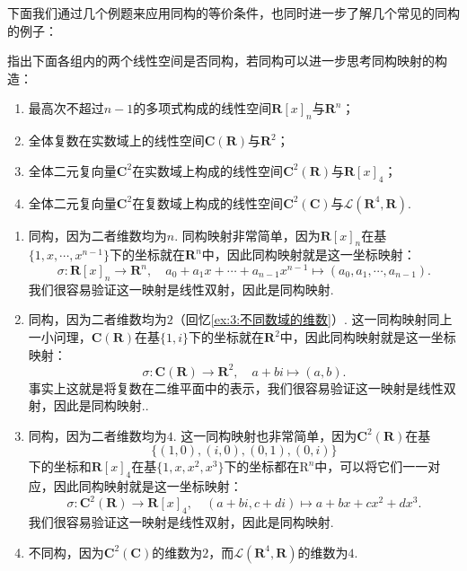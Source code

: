 下面我们通过几个例题来应用同构的等价条件，也同时进一步了解几个常见的同构的例子：
\begin{example}
    指出下面各组内的两个线性空间是否同构，若同构可以进一步思考同构映射的构造：
    \begin{enumerate}
        \item 最高次不超过$n-1$的多项式构成的线性空间$\mathbf{R}[x]_n$与$\mathbf{R}^n$；

        \item 全体复数在实数域上的线性空间$\mathbf{C}(\mathbf{R})$与$\mathbf{R}^2$；

        \item 全体二元复向量$\mathbf{C}^2$在实数域上构成的线性空间$\mathbf{C}^2(\mathbf{R})$与$\mathbf{R}[x]_4$；

        \item 全体二元复向量$\mathbf{C}^2$在复数域上构成的线性空间$\mathbf{C}^2(\mathbf{C})$与$\mathcal{L}(\mathbf{R}^4,\mathbf{R})$.
    \end{enumerate}
\end{example}

\begin{solution}
    \begin{enumerate}
        \item 同构，因为二者维数均为$n$. 同构映射非常简单，因为$\mathbf{R}[x]_n$在基$\{1,x,\cdots,x^{n-1}\}$下的坐标就在$\mathbf{R}^n$中，因此同构映射就是这一坐标映射：
              \[\sigma:\mathbf{R}[x]_n\to\mathbf{R}^n,\quad a_0+a_1x+\cdots+a_{n-1}x^{n-1}\mapsto(a_0,a_1,\cdots,a_{n-1}).\]
              我们很容易验证这一映射是线性双射，因此是同构映射.

        \item 同构，因为二者维数均为$2$（回忆\autoref{ex:3:不同数域的维数}）. 这一同构映射同上一小问理，$\mathbf{C}(\mathbf{R})$在基$\{1,i\}$下的坐标就在$\mathbf{R}^2$中，因此同构映射就是这一坐标映射：
              \[\sigma:\mathbf{C}(\mathbf{R})\to\mathbf{R}^2,\quad a+bi\mapsto(a,b).\]
              事实上这就是将复数在二维平面中的表示，我们很容易验证这一映射是线性双射，因此是同构映射..

        \item 同构，因为二者维数均为$4$. 这一同构映射也非常简单，因为$\mathbf{C}^2(\mathbf{R})$在基
              \[\{(1,0),(i,0),(0,1),(0,i)\}\]
              下的坐标和$\mathbf{R}[x]_4$在基$\{1,x,x^2,x^3\}$下的坐标都在$\mathrm{R}^n$中，可以将它们一一对应，因此同构映射就是这一坐标映射：
              \[\sigma:\mathbf{C}^2(\mathbf{R})\to\mathbf{R}[x]_4,\quad (a+bi,c+di)\mapsto a+bx+cx^2+dx^3.\]
              我们很容易验证这一映射是线性双射，因此是同构映射.

        \item 不同构，因为$\mathbf{C}^2(\mathbf{C})$的维数为$2$，而$\mathcal{L}(\mathbf{R}^4,\mathbf{R})$的维数为$4$.
    \end{enumerate}
\end{solution}

